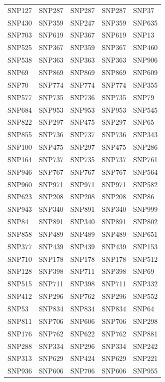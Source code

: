 \begin{table}[ht]
\begin{tabular}{lllll}
  SNP127 & SNP287 & SNP287 & SNP287 & SNP37 \\ 
  SNP430 & SNP359 & SNP247 & SNP359 & SNP635 \\ 
  SNP703 & SNP619 & SNP367 & SNP619 & SNP13 \\ 
  SNP525 & SNP367 & SNP359 & SNP367 & SNP460 \\ 
  SNP538 & SNP363 & SNP363 & SNP363 & SNP906 \\ 
  SNP69 & SNP869 & SNP869 & SNP869 & SNP609 \\ 
  SNP70 & SNP774 & SNP774 & SNP774 & SNP355 \\ 
  SNP577 & SNP735 & SNP736 & SNP735 & SNP79 \\ 
  SNP684 & SNP953 & SNP953 & SNP953 & SNP545 \\ 
  SNP822 & SNP297 & SNP475 & SNP297 & SNP65 \\ 
  SNP855 & SNP736 & SNP737 & SNP736 & SNP343 \\ 
  SNP100 & SNP475 & SNP297 & SNP475 & SNP286 \\ 
  SNP164 & SNP737 & SNP735 & SNP737 & SNP761 \\ 
  SNP946 & SNP767 & SNP767 & SNP767 & SNP564 \\ 
  SNP960 & SNP971 & SNP971 & SNP971 & SNP582 \\ 
  SNP623 & SNP208 & SNP208 & SNP208 & SNP86 \\ 
  SNP943 & SNP340 & SNP891 & SNP340 & SNP999 \\ 
  SNP84 & SNP891 & SNP340 & SNP891 & SNP802 \\ 
  SNP858 & SNP489 & SNP489 & SNP489 & SNP651 \\ 
  SNP377 & SNP439 & SNP439 & SNP439 & SNP153 \\ 
  SNP710 & SNP178 & SNP178 & SNP178 & SNP512 \\ 
  SNP128 & SNP398 & SNP711 & SNP398 & SNP69 \\ 
  SNP515 & SNP711 & SNP398 & SNP711 & SNP332 \\ 
  SNP412 & SNP296 & SNP762 & SNP296 & SNP552 \\ 
  SNP53 & SNP834 & SNP834 & SNP834 & SNP64 \\ 
  SNP811 & SNP706 & SNP606 & SNP706 & SNP298 \\ 
  SNP176 & SNP762 & SNP622 & SNP762 & SNP881 \\ 
  SNP288 & SNP334 & SNP296 & SNP334 & SNP242 \\ 
  SNP313 & SNP629 & SNP424 & SNP629 & SNP221 \\ 
  SNP936 & SNP606 & SNP706 & SNP606 & SNP955 \\ 

\end{tabular}
\end{table}
